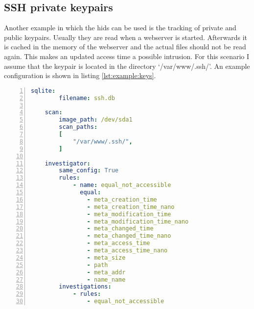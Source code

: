 \subsection{SSH private keypairs}

Another example in which the \gls{hids} can be used is the tracking of private and public keypairs. Usually they are read when a webserver is started. Afterwards it is cached in the memory of the webserver and the actual files should not be read again. This makes an updated access time a possible intrusion. For this scenario I assume that the keypair is located in the directory `/var/www/.ssh/'. An example configuration is shown in listing \ref{lst:example:keys}.

\begin{lstlisting}[language=yaml, numbers=left, caption=Scanner Configuration, label=lst:example:keys]
    sqlite:
        filename: ssh.db
        
    scan:
        image_path: /dev/sda1
        scan_paths: 
        [
            "/var/www/.ssh/",
        ]

    investigator:
        same_config: True
        rules: 
            - name: equal_not_accessible
              equal:
                - meta_creation_time
                - meta_creation_time_nano
                - meta_modification_time
                - meta_modification_time_nano
                - meta_changed_time
                - meta_changed_time_nano
                - meta_access_time
                - meta_access_time_nano
                - meta_size
                - path
                - meta_addr
                - name_name
        investigations:
            - rules:
                - equal_not_accessible

\end{lstlisting}

